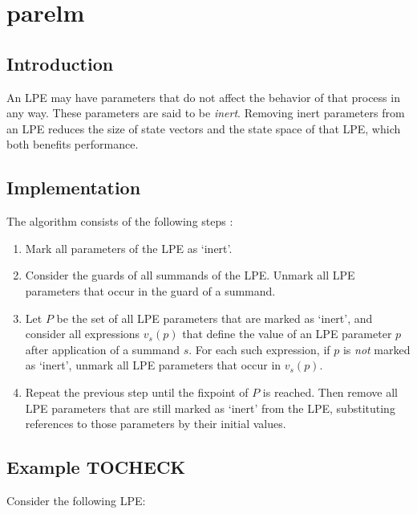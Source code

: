 \chapter{parelm}

\section{Introduction}

An LPE may have parameters that do not affect the behavior of that process in any way.
These parameters are said to be \emph{inert}.
Removing inert parameters from an LPE reduces the size of state vectors and the state space of that LPE, which both benefits performance.

\section{Implementation}

The algorithm consists of the following steps \cite{groote2001computer}:

\begin{enumerate}

\item Mark all parameters of the LPE as `inert'.

\item Consider the guards of all summands of the LPE.
Unmark all LPE parameters that occur in the guard of a summand.

\item Let $P$ be the set of all LPE parameters that are marked as `inert', and consider all expressions $v_s(p)$ that define the value of an LPE parameter $p$ after application of a summand $s$.
For each such expression, if $p$ is \emph{not} marked as `inert', unmark all LPE parameters that occur in $v_s(p)$.

\item Repeat the previous step until the fixpoint of $P$ is reached.
Then remove all LPE parameters that are still marked as `inert' from the LPE, substituting references to those parameters by their initial values.

\end{enumerate}

\clearpage
\section{Example TOCHECK}

Consider the following LPE:

